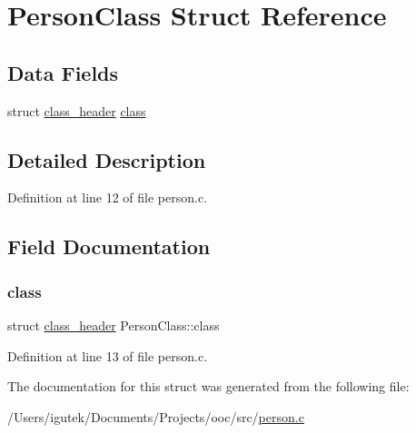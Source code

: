 \hypertarget{structPersonClass}{}\section{Person\+Class Struct Reference}
\label{structPersonClass}
\subsection*{Data Fields}
\begin{DoxyCompactItemize}
\item 
struct \mbox{\hyperlink{structclass__header}{class\+\_\+header}} \mbox{\hyperlink{structPersonClass_a5ace8304edfca4a772756b37bf7f0212}{class}}
\end{DoxyCompactItemize}


\subsection{Detailed Description}


Definition at line 12 of file person.\+c.



\subsection{Field Documentation}
\mbox{\label{structPersonClass_a5ace8304edfca4a772756b37bf7f0212}} 
\subsubsection{\texorpdfstring{class}{class}}
{\footnotesize\ttfamily struct \mbox{\hyperlink{structclass__header}{class\+\_\+header}} Person\+Class\+::class}



Definition at line 13 of file person.\+c.



The documentation for this struct was generated from the following file\+:\begin{DoxyCompactItemize}
\item 
/\+Users/igutek/\+Documents/\+Projects/ooc/src/\mbox{\hyperlink{person_8c}{person.\+c}}\end{DoxyCompactItemize}
